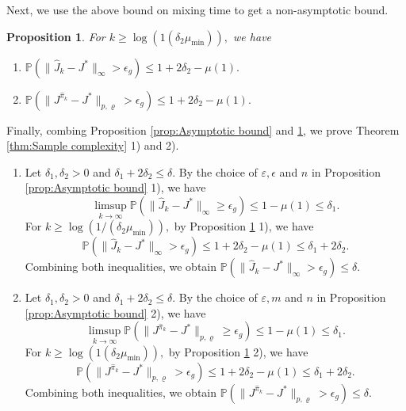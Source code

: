 \documentclass[12pt,technote,onecolumn]{IEEEtran}
\newtheorem{proposition}{Proposition}
\begin{document}
\begin{IEEEproof}
	Next, we use the above bound on mixing time to get a non-asymptotic
	bound.
	\begin{proposition}
		\label{prop:Non-asymptotic bound} For $k\geq\log\left({1}{(\delta_{2}\mu_{\min})}\right),$
		we have
		\begin{enumerate}
			\item $\mathbb{P}(\|\widehat{J}_{k}-J^{*}\|_{\infty}>\epsilon_{g})\leq1+2\delta_{2}-\mu\left(1\right).$
			\item $\mathbb{P}(\|J^{\widehat{\pi}_{k}}-J^{*}\|_{p,\varrho}>\epsilon_{g})\leq1+2\delta_{2}-\mu\left(1\right).$
		\end{enumerate}
	\end{proposition}
	
	Finally, combing Proposition \ref{prop:Asymptotic bound} and \ref{prop:Non-asymptotic bound},
	we prove Theorem \ref{thm:Sample complexity} 1) and 2).
	\begin{enumerate}
		\item Let $\delta_{1},\delta_{2}>0$ and $\delta_{1}+2\delta_{2}\leq\delta.$
		By the choice of $\varepsilon,\epsilon$ and $n$ in Proposition
		\ref{prop:Asymptotic bound} 1), we have
		\[
		\limsup_{k\rightarrow\infty}\mathbb{P}(\|\widehat{J}_{k}-J^{*}\|_{\infty}\geq\epsilon_{g})\leq1-\mu(1)\leq\delta_{1}.
		\]
		For $k\geq\log({1}/{(\delta_{2}\mu_{\min})}),$ by Proposition
		\ref{prop:Non-asymptotic bound} 1), we have
		\[
		\mathbb{P}(\|\widehat{J}_{k}-J^{*}\|_{\infty}>\epsilon_{g})\leq1+2\delta_{2}-\mu\left(1\right)\leq\delta_{1}+2\delta_{2}.
		\]
		Combining both inequalities, we obtain $\mathbb{P}(\|\widehat{J}_{k}-J^{*}\|_{\infty}>\epsilon_{g})\leq\delta$.
		\item Let $\delta_{1},\delta_{2}>0$ and $\delta_{1}+2\delta_{2}\leq\delta.$
		By the choice of $\varepsilon,m$ and $n$ in Proposition \ref{prop:Asymptotic bound}
		2), we have
		\[
		\limsup_{k\rightarrow\infty}\mathbb{P}(\|J^{\widehat{\pi}_{k}}-J^{*}\|_{p,\varrho}\geq\epsilon_{g})\leq1-\mu\left(1\right)\leq\delta_{1}.
		\]
		For $k\geq\log\left({1}{(\delta_{2}\mu_{\min})}\right),$ by Proposition
		\ref{prop:Non-asymptotic bound} 2), we have
		\[
		\mathbb{P}(\|J^{\widehat{\pi}_{k}}-J^{*}\|_{p,\varrho}>\epsilon_{g})\leq1+2\delta_{2}-\mu\left(1\right)\leq\delta_{1}+2\delta_{2}.
		\]
		Combining both inequalities, we obtain $\mathbb{P}\left(\|J^{\widehat{\pi}_{k}}-J^{*}\|_{p,\varrho}>\epsilon_{g}\right)\leq\delta$.
	\end{enumerate}	
\end{IEEEproof}
\end{document}
